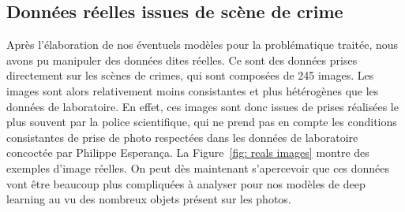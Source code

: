 \documentclass[a4paper]{article}
\begin{document}
\subsection{Données réelles issues de scène de crime}
Après l'élaboration de nos éventuels modèles pour la problématique traitée, nous avons pu manipuler des données dites réelles. Ce sont des données prises directement sur les scènes de crimes, qui sont composées de 245 images. Les images sont alors relativement moins consistantes et plus hétérogènes que les données de laboratoire. En effet, ces images sont donc issues de prises réalisées le plus souvent par la police scientifique, qui ne prend pas en compte les conditions consistantes de prise de photo respectées dans les données de laboratoire concoctée par Philippe Esperança. La Figure~\ref{fig: reals images} montre des exemples d'image réelles. On peut dès maintenant s'apercevoir que ces données vont être beaucoup plus compliquées à analyser pour nos modèles de deep learning au vu des nombreux objets présent sur les photos.
\end{document}
